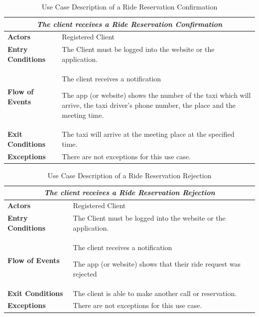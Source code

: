 \documentclass[a4paper]{article}
\begin{document}
\begin{table} [H]
\begin{center}
\begin{tabular}{ |m{}|m{}|  }
\hline
    \multicolumn{2}{|c|}{\textbf{\textit{The client receives a Ride Reservation Confirmation}}} \\
\hline \hline
    \textbf{Actors}
&   Registered Client
\\ \hline
    \textbf{Entry Conditions}
&   The Client must be logged into the website or the application.
\\ \hline
    \textbf{Flow of Events}
& 
    \begin{enumerate*}
    \item The client receives a notification
    \item The app (or website) shows the number of the taxi which will arrive, the taxi driver's phone number, the place and the meeting time.
    \end{enumerate*}
\\ \hline
    \textbf{Exit Conditions}
&   The taxi will arrive at the meeting place at the specified time.
\\ \hline
    \textbf{Exceptions}
&   
    There are not exceptions for this use case.
\\ \hline
\end{tabular}
\end{center}
\caption{Use Case Description of a Ride Reservation Confirmation}
\label{table:clientrideconfirmation}
\end{table}

\begin{table} [H]
\begin{center}
\begin{tabular}{ |m{}|m{}|  }
\hline
    \multicolumn{2}{|c|}{\textbf{\textit{The client receives a Ride Reservation Rejection}}} \\
\hline \hline
    \textbf{Actors}
&   Registered Client
\\ \hline
    \textbf{Entry Conditions}
&   The Client must be logged into the website or the application.
\\ \hline
    \textbf{Flow of Events}
& 
    \begin{enumerate*}
    \item The client receives a notification
    \item The app (or website) shows that their ride request was rejected
    \end{enumerate*}
\\ \hline
    \textbf{Exit Conditions}
&   The client is able to make another call or reservation.
\\ \hline
    \textbf{Exceptions}
&   
    There are not exceptions for this use case.
\\ \hline
\end{tabular}
\end{center}
\caption{Use Case Description of a Ride Reservation Rejection}
\label{table:clienridetrejection}
\end{table}
\end{document}
